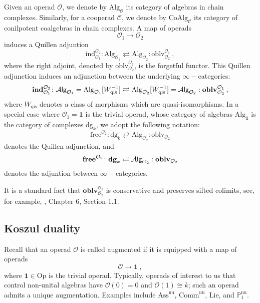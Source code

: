 \documentclass[10pt, oneside]{amsart}
\theoremstyle{plain}
\newcommand{\alg}{\mathrm{Alg}}
\newcommand{\Alg}{\mathcal{A}\text{\sf lg}}
\newcommand{\ass}{\mathrm{Ass}}
\newcommand{\C}{\mathcal{C}}
\newcommand{\comm}{\mathrm{Comm}}
\newcommand{\coalg}{\mathrm{CoAlg}}
\newcommand{\dg}{\mathrm{dg}}
\newcommand{\Dg}{\mathbf{dg}}
\newcommand{\free}{\mathrm{free}}
\newcommand{\Free}{\mathbf{free}}
\newcommand{\Ind}{\mathbf{ind}}
\newcommand{\ind}{\mathrm{ind}}
\newcommand{\lie}{\mathrm{Lie}}
\renewcommand{\O}{\mathcal{O}}
\newcommand{\oblv}{\mathrm{oblv}}
\newcommand{\Oblv}{\mathbf{oblv}}
\newcommand{\op}{\mathrm{Op}}
\newcommand{\PP}{\mathbb{P}}
\begin{document}
Given an operad $\O$, we denote by $\alg_\O$ its category of algebras in chain complexes. Similarly, for a cooperad $\C$, we denote
by $\coalg_\C$ its category of conilpotent coalgebras in chain complexes. A map of operads
\begin{equation*}
\O_1 \longrightarrow \O_2
\end{equation*}
induces a Quillen adjuntion
\begin{equation*}
\ind^{\O_2}_{\O_1} \colon \alg_{\O_1} \rightleftarrows \alg_{\O_2} : \oblv^{\O_1}_{\O_2} \:,
\end{equation*}
where the right adjoint, denoted by $\oblv^{\O_1}_{\O_2}$, is the forgetful functor. This Quillen adjunction induces an adjunction
between the underlying $\infty-$categories:
\begin{equation*}
\Ind^{\O_2}_{\O_1} \colon \Alg_{\O_1} = \alg_{\O_1}[W^{-1}_\text{qis}] \rightleftarrows \alg_{\O_2}[W^{-1}_\text{qis}] = \Alg_{\O_2} : \Oblv^{\O_1}_{\O_2} \:,
\end{equation*}
where $W_\text{qis}$ denotes a class of morphisms which are quasi-isomorphisms. In a special case where $\O_1 = \mathbf{1}$ is the
trivial operad, whose category of algebras $\alg_{\mathbf{1}}$ is the category of complexes $\dg_k$, we adopt the following notation:
\begin{equation*}
\free^{\O_2} \colon \dg_k \rightleftarrows \alg_{\O_2} : \oblv_{\O_2}
\end{equation*}
denotes the Quillen adjunction, and
\begin{equation*}
\Free^{\O_2} \colon \Dg_k \rightleftarrows \Alg_{\O_2} : \Oblv_{\O_2}
\end{equation*}
denotes the adjuntion between $\infty-$categories.

It is a standard fact that $\Oblv^{\O_1}_{\O_2}$ is conservative and preserves sifted colimits, see, for example, \cite{GR2},
Chapter 6, Section 1.1.

\subsection{Koszul duality}\label{subsec23}

Recall that an operad $\O$ is called augmented if it is equipped with a map of operads
\begin{equation*}
\O \longrightarrow \mathbf{1} \:,
\end{equation*}
where $\mathbf{1} \in \op$ is the trivial operad. Typically, operads of interest to us that control non-unital algebras have
$\O(0) = 0$ and $\O(1) \cong k$; such an operad admits a unique augmentation. Examples include $\ass^\text{nu}$, $\comm^\text{nu}$, 
$\lie$, and $\PP_1^\text{nu}$.
\end{document}

